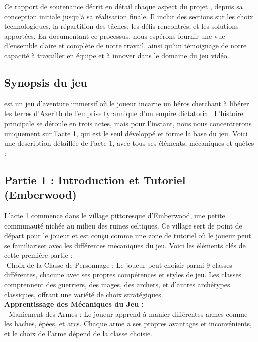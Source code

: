 Ce rapport de soutenance décrit en détail chaque aspect du projet
\gameName, depuis sa conception initiale jusqu'à sa réalisation finale.
Il inclut des sections sur les choix technologiques, la répartition des tâches, les défis rencontrés, et les solutions apportées. En documentant ce processus,
nous espérons fournir une vue d'ensemble claire et complète de notre travail, ainsi qu'un témoignage de notre capacité à travailler en équipe et à innover dans le domaine du
jeu vidéo.






\subsection{Synopsis du jeu}

\gameName est un jeu d'aventure immersif où le joueur incarne un héros cherchant à libérer les terres d'Azerith de l'emprise tyrannique d'un empire dictatorial.
L'histoire principale se déroule en trois actes, mais pour l'instant, nous nous concentrerons uniquement sur l'acte 1, qui est le seul développé et forme la base du jeu.
Voici une description détaillée de l'acte 1, avec tous ses éléments, mécaniques et quêtes :

\subsection*{Partie 1 : Introduction et Tutoriel (Emberwood)}

L'acte 1 commence dans le village pittoresque d'Emberwood, une petite communauté nichée au milieu des ruines celtiques.
Ce village sert de point de départ pour le joueur et est conçu comme une zone de tutoriel où le joueur peut se familiariser avec les différentes mécaniques du jeu.
Voici les éléments clés de cette première partie :
\\

-Choix de la Classe de Personnage : Le joueur peut choisir parmi 9 classes différentes, chacune avec ses propres compétences et styles de jeu. Les classes comprennent des guerriers, des mages, des archers, et d'autres archétypes classiques, offrant une variété de choix stratégiques.
\\

\textbf{Apprentissage des Mécaniques du Jeu : }
\\

- Maniement des Armes : Le joueur apprend à manier différentes armes comme les haches, épées, et arcs.
Chaque arme a ses propres avantages et inconvénients, et le choix de l'arme dépend de la classe choisie.
\\

